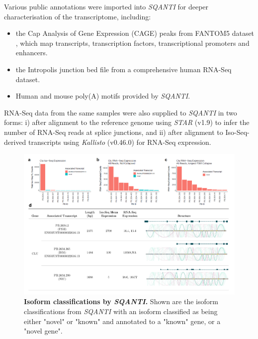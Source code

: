 Various public annotations were imported into \textit{SQANTI} for deeper characterisation of the transcriptome, including:
\begin{itemize}
	\item the Cap Analysis of Gene Expression (CAGE) peaks from FANTOM5 dataset \cite{Lizio2019}, which map transcripts, transcription factors, transcriptional promoters and enhancers.
	\item the Intropolis junction bed file\cite{Nellore2016} from a comprehensive human RNA-Seq dataset.
	\item Human and mouse poly(A) motifs provided by \textit{SQANTI}.	 
\end{itemize}

RNA-Seq data from the same samples were also supplied to \textit{SQANTI} in two forms: i) after alignment to the reference genome using \textit{STAR}\cite{Dobin2013} (v1.9) to infer the number of RNA-Seq reads at splice junctions, and ii) after alignment to Iso-Seq-derived transcripts using \textit{Kallisto}\cite{Bray2016} (v0.46.0) for RNA-Seq expression.  

\begin{landscape}
	\begin{figure}[h]
		\centering
		\includegraphics[page=3,trim={0 3.5cm 0 0},clip,scale = 0.9]{Figures/ProjectDevelopment_Figures_Landscape}
		\captionsetup{width=1.5\textwidth}
		\caption[Isoform classifications by \textit{SQANTI}]%
		{\textbf{Isoform classifications by \textit{SQANTI}.} Shown are the isoform classifications from \textit{SQANTI} with an isoform classified as being either "novel" or "known" and annotated to a "known" gene, or a "novel gene".}
		\label{fig:sqanti_cate}
	\end{figure}
\end{landscape}

